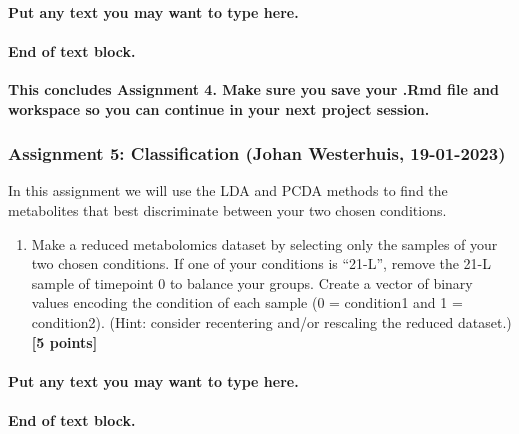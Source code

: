 \documentclass[
]{article}
\providecommand{\tightlist}{%
  \setlength{\itemsep}{0pt}\setlength{\parskip}{0pt}}
\begin{document}
\hypertarget{put-any-text-you-may-want-to-type-here.-25}{%
\paragraph{Put any text you may want to type
here.}\label{put-any-text-you-may-want-to-type-here.-25}}

\hypertarget{end-of-text-block.-27}{%
\paragraph{\texorpdfstring{End of text block.\\
}{End of text block. }}\label{end-of-text-block.-27}}

\hfill\break
\textbf{This concludes Assignment 4. Make sure you save your .Rmd file
and workspace so you can continue in your next project session.}

\hypertarget{assignment-5-classification-johan-westerhuis-19-01-2023}{%
\subsubsection{Assignment 5: Classification (Johan Westerhuis,
19-01-2023)}\label{assignment-5-classification-johan-westerhuis-19-01-2023}}

In this assignment we will use the LDA and PCDA methods to find the
metabolites that best discriminate between your two chosen conditions.\\

\begin{enumerate}
\def\labelenumi{\Alph{enumi})}
\tightlist
\item
  Make a reduced metabolomics dataset by selecting only the samples of
  your two chosen conditions. If one of your conditions is ``21-L'',
  remove the 21-L sample of timepoint 0 to balance your groups. Create a
  vector of binary values encoding the condition of each sample (0 =
  condition1 and 1 = condition2). (Hint: consider recentering and/or
  rescaling the reduced dataset.) \textbf{{[}5 points{]}}
\end{enumerate}

\hypertarget{put-any-text-you-may-want-to-type-here.-26}{%
\paragraph{Put any text you may want to type
here.}\label{put-any-text-you-may-want-to-type-here.-26}}

\hypertarget{end-of-text-block.-28}{%
\paragraph{End of text block.}\label{end-of-text-block.-28}}
\end{document}
